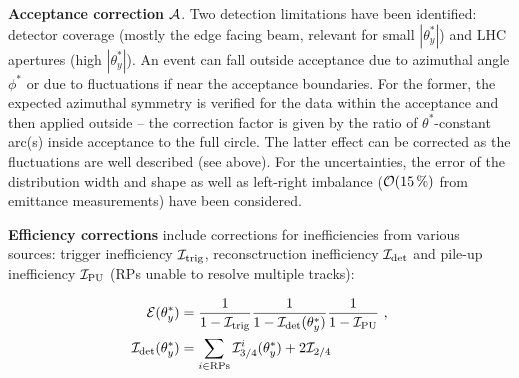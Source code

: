 \documentclass[twocolumn,a4paper,superscriptaddress,preprintnumbers,showpacs,nofootinbib]{revtex4-1}
\def\un#1{\,{\rm #1}}
\begin{document}
{\bf Acceptance correction} ${\cal A}$. Two detection limitations have been identified: detector coverage (mostly the edge facing beam, relevant for small $|\theta_y^*|$) and LHC apertures (high $|\theta_y^*|$). An event can fall outside acceptance due to azimuthal angle $\phi^*$ or due to fluctuations if near the acceptance boundaries. For the former, the expected azimuthal symmetry is verified for the data within the acceptance and then applied outside -- the correction factor is given by the ratio of $\theta^*$-constant arc(s) inside acceptance to the full circle. The latter effect can be corrected as the fluctuations are well described (see above). For the uncertainties, the error of the distribution width and shape as well as left-right imbalance (${\cal O}(15\un{\%})$ from emittance measurements) have been considered.

{\bf Efficiency corrections} include corrections for inefficiencies from various sources: trigger inefficiency ${\cal I}_{\rm trig}$, reconsctruction inefficiency ${\cal I}_{\rm det}$ and pile-up inefficiency ${\cal I}_{\rm PU}$ (RPs unable to resolve multiple tracks):

\begin{equation}
\label{efficiency}
	\begin{aligned}
		{\cal E}(\theta_y^*) &= {1\over 1 - {\cal I}_{\rm trig}} {1\over 1 - {\cal I}_{\rm det}(\theta_y^*)} {1\over 1 - {\cal I}_{\rm PU}}\ ,\\
		{\cal I}_{\rm det}(\theta_y^*) &= \sum\limits_{i\in \rm RPs} {\cal I}^i_{3/4}(\theta_y^*) + 2 {\cal I}_{2/4}\\
	\end{aligned}
\end{equation}
\end{document}

